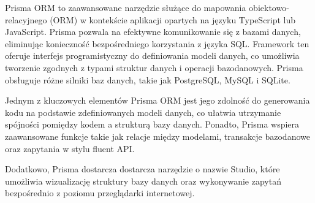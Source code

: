 Prisma ORM to zaawansowane narzędzie służące do mapowania obiektowo-relacyjnego (ORM) w kontekście aplikacji opartych na języku TypeScript lub JavaScript. Prisma pozwala na efektywne komunikowanie się z bazami danych, eliminując konieczność bezpośredniego korzystania z języka SQL. Framework ten oferuje interfejs programistyczny do definiowania modeli danych, co umożliwia tworzenie zgodnych z typami struktur danych i operacji bazodanowych. Prisma obsługuje różne silniki baz danych, takie jak PostgreSQL, MySQL i SQLite. \autocite{prisma}

Jednym z kluczowych elementów Prisma ORM jest jego zdolność do generowania kodu na podstawie zdefiniowanych modeli danych, co ułatwia utrzymanie spójności pomiędzy kodem a strukturą bazy danych. Ponadto, Prisma wspiera zaawansowane funkcje takie jak relacje między modelami, transakcje bazodanowe oraz zapytania w stylu fluent API.

Dodatkowo, Prisma dostarcza dostarcza narzędzie o nazwie Studio, które umożliwia wizualizację struktury bazy danych oraz wykonywanie zapytań bezpośrednio z poziomu przeglądarki internetowej.